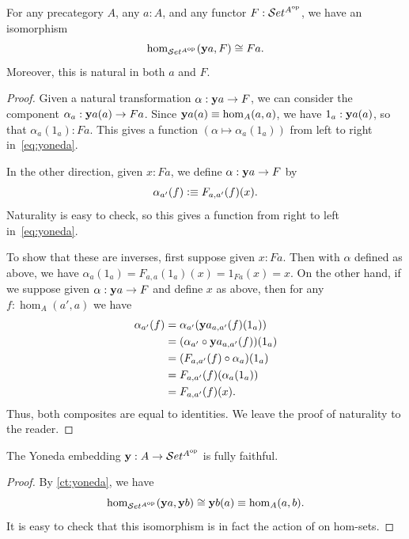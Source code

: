 \begin{thm}\label{ct:yoneda}
  For any precategory $A$, any $a:A$, and any functor $F:\mathcal{S}et^{A^{\mathrm{op}}}$, we have an isomorphism
  \begin{equation}\label{eq:yoneda}
    \hom_{\mathcal{S}et^{A^{\mathrm{op}}}}(\mathbf{y} a, F) \cong Fa.
  \end{equation}
  Moreover, this is natural in both $a$ and $F$.
\end{thm}
\begin{proof}
  Given a natural transformation $\alpha:\mathbf{y} a \to F$, we can consider the component $\alpha_a : \mathbf{y} a(a) \to F a$.
  Since $\mathbf{y} a(a)\equiv \hom_A(a,a)$, we have $1_a : \mathbf{y} a(a)$, so that $\alpha_a(1_a) : F a$.
  This gives a function $(\alpha \mapsto \alpha_a(1_a))$ from left to right in~\eqref{eq:yoneda}.

  In the other direction, given $x:F a$, we define $\alpha:\mathbf{y} a \to F$ by
  \[\alpha_{a'}(f) \vcentcolon\equiv F_{a,a'}(f)(x). \]
  Naturality is easy to check, so this gives a function from right to left in~\eqref{eq:yoneda}.

  To show that these are inverses, first suppose given $x:F a$.
  Then with $\alpha$ defined as above, we have $\alpha_a(1_a) = F_{a,a}(1_a)(x) = 1_{F a}(x) = x$.
  On the other hand, if we suppose given $\alpha:\mathbf{y} a \to F$ and define $x$ as above, then for any $f:\hom_A(a',a)$ we have
  \begin{align*}
    \alpha_{a'}(f)
    &= \alpha_{a'} (\mathbf{y} a_{a,a'}(f)(1_a))\\
    &= (\alpha_{a'}\circ \mathbf{y} a_{a,a'}(f))(1_a)\\
    &= (F_{a,a'}(f)\circ \alpha_a)(1_a)\\
    &= F_{a,a'}(f)(\alpha_a(1_a))\\
    &= F_{a,a'}(f)(x).
  \end{align*}
  Thus, both composites are equal to identities.
  We leave the proof of naturality to the reader.
\end{proof}

\begin{cor}\label{ct:yoneda-embedding}
  The Yoneda embedding $\mathbf{y} :A\to \mathcal{S}et^{A^{\mathrm{op}}}$ is fully faithful.
\end{cor}
\begin{proof}
  By \cref{ct:yoneda}, we have
  \[ \hom_{\mathcal{S}et^{A^{\mathrm{op}}}}(\mathbf{y} a, \mathbf{y} b) \cong \mathbf{y} b(a) \equiv \hom_A(a,b). \]
  It is easy to check that this isomorphism is in fact the action of \y on hom-sets.
\end{proof}

